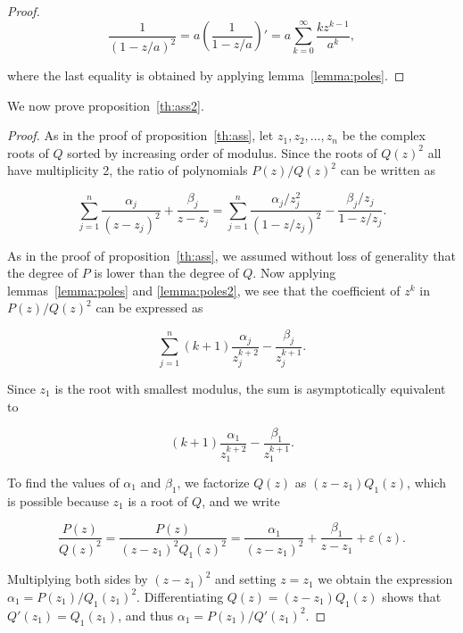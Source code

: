 \documentclass{article}
\begin{document}
\begin{proof}
\begin{equation*}
\frac{1}{(1-z/a)^2} = a \left( \frac{1}{1-z/a} \right)'
= a \sum_{k=0}^\infty \frac{kz^{k-1}}{a^k},
\end{equation*}

\noindent
where the last equality is obtained by applying lemma~\ref{lemma:poles}.
\end{proof}

We now prove proposition~\ref{th:ass2}.

\begin{proof}
As in the proof of proposition~\ref{th:ass}, let $z_1, z_2, \ldots, z_n$
be the complex roots of $Q$ sorted by increasing order of modulus. Since
the roots of $Q(z)^2$ all have multiplicity 2, the ratio of polynomials
$P(z)/Q(z)^2$ can be written as

\begin{equation*}
\sum_{j=1}^n \frac{\alpha_j}{(z-z_j)^2} + \frac{\beta_j}{z-z_j} =
\sum_{j=1}^n \frac{\alpha_j/z_j^2}{(1-z/z_j)^2}
-\frac{\beta_j/z_j}{1-z/z_j}.
\end{equation*}

As in the proof of proposition~\ref{th:ass}, we assumed without loss of
generality that the degree of $P$ is lower than the degree of $Q$. Now
applying lemmas~\ref{lemma:poles} and \ref{lemma:poles2}, we see that
the coefficient of $z^k$ in $P(z)/Q(z)^2$ can be expressed as

\begin{equation}
\label{eq:fullass2}
\sum_{j=1}^n (k+1)\frac{\alpha_j}{z_j^{k+2}}-\frac{\beta_j}{z_j^{k+1}}.
\end{equation}

Since $z_1$ is the root with smallest modulus, the sum is asymptotically
equivalent to

\begin{equation*}
(k+1)\frac{\alpha_1}{z_1^{k+2}}-\frac{\beta_1}{z_1^{k+1}}.
\end{equation*}

To find the values of $\alpha_1$ and $\beta_1$, we factorize $Q(z)$ as
$(z-z_1)Q_1(z)$, which is possible because $z_1$ is a root of $Q$,
and we write

\begin{equation}
\label{eq:misc1}
\frac{P(z)}{Q(z)^2} =
\frac{P(z)}{(z-z_1)^2Q_1(z)^2} = \frac{\alpha_1}{(z-z_1)^2} +
\frac{\beta_1}{z-z_1} + \varepsilon(z).
\end{equation}

Multiplying both sides by $(z-z_1)^2$ and setting $z = z_1$ we obtain the
expression $\alpha_1 = P(z_1)/Q_1(z_1)^2$.  Differentiating $Q(z) =
(z-z_1)Q_1(z)$ shows that $Q'(z_1) = Q_1(z_1)$, and thus $\alpha_1 =
P(z_1) / Q'(z_1)^2$.


\end{proof}
\end{document}
